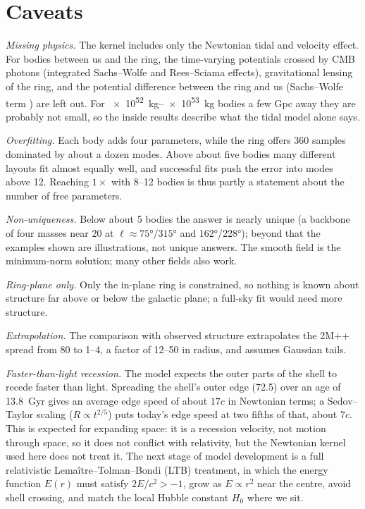 \documentclass[aps,prd,twocolumn,nofootinbib,superscriptaddress,floatfix]{revtex4-2}
\begin{document}
\section{Caveats}
\emph{Missing physics.} The kernel includes only the Newtonian tidal and velocity effect. For bodies between us and the ring, the time-varying potentials crossed by CMB photons (integrated Sachs--Wolfe \cite{SachsWolfe1967} and Rees--Sciama \cite{ReesSciama1968} effects), gravitational lensing of the ring, and the potential difference between the ring and us (Sachs--Wolfe term \cite{SachsWolfe1967}) are left out. For \SIrange{e52}{e53}{\kilo\gram} bodies a few Gpc away they are probably not small, so the inside results describe what the tidal model alone says.

\emph{Overfitting.} Each body adds four parameters, while the ring offers 360 samples dominated by about a dozen modes. Above about five bodies many different layouts fit almost equally well, and successful fits push the error into modes above 12. Reaching $1\times$ with 8--12 bodies is thus partly a statement about the number of free parameters.

\emph{Non-uniqueness.} Below about 5 bodies the answer is nearly unique (a backbone of four masses near \SI{20}{\Gpc} at $\ell\approx\ang{75}/\ang{315}$ and \ang{162}/\ang{228}); beyond that the examples shown are illustrations, not unique answers. The smooth field is the minimum-norm solution; many other fields also work.

\emph{Ring-plane only.} Only the in-plane ring is constrained, so nothing is known about structure far above or below the galactic plane; a full-sky fit would need more structure.

\emph{Extrapolation.} The comparison with observed structure extrapolates the 2M++ spread from \SI{80}{\Mpc} to \SIrange{1}{4}{\Gpc}, a factor of 12--50 in radius, and assumes Gaussian tails.

\emph{Faster-than-light recession.} The model expects the outer parts of the shell to recede faster than light. Spreading the shell's outer edge (\SI{72.5}{\Gpc}) over an age of \SI{13.8}{Gyr} gives an average edge speed of about $17c$ in Newtonian terms; a Sedov--Taylor scaling ($R\propto t^{2/5}$) puts today's edge speed at two fifths of that, about $7c$. This is expected for expanding space: it is a recession velocity, not motion through space, so it does not conflict with relativity, but the Newtonian kernel used here does not treat it. The next stage of model development is a full relativistic Lema\^itre--Tolman--Bondi (LTB) treatment, in which the energy function $E(r)$ must satisfy $2E/c^2>-1$, grow as $E\propto r^2$ near the centre, avoid shell crossing, and match the local Hubble constant $H_0$ where we sit.
\end{document}
